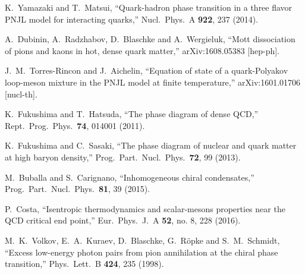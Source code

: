 \documentclass{webofc}
\begin{document}
\begin{thebibliography}{}
  K.~Yamazaki and T.~Matsui,
  ``Quark-hadron phase transition in a three flavor PNJL model for interacting quarks,''
  Nucl.\ Phys.\ A {\bf 922}, 237 (2014).

  A.~Dubinin, A.~Radzhabov, D.~Blaschke and A.~Wergieluk,
  ``Mott dissociation of pions and kaons in hot, dense quark matter,''
  arXiv:1608.05383 [hep-ph].

  J.~M.~Torres-Rincon and J.~Aichelin,
  ``Equation of state of a quark-Polyakov loop-meson mixture in the PNJL model at finite temperature,''
  arXiv:1601.01706 [nucl-th].

  K.~Fukushima and T.~Hatsuda,
  ``The phase diagram of dense QCD,''
  Rept.\ Prog.\ Phys.\  {\bf 74}, 014001 (2011).

  K.~Fukushima and C.~Sasaki,
  ``The phase diagram of nuclear and quark matter at high baryon density,''
  Prog.\ Part.\ Nucl.\ Phys.\  {\bf 72}, 99 (2013).

  M.~Buballa and S.~Carignano,
  ``Inhomogeneous chiral condensates,''
  Prog.\ Part.\ Nucl.\ Phys.\  {\bf 81}, 39 (2015).

  P.~Costa,
  ``Isentropic thermodynamics and scalar-mesons properties near the QCD critical end point,''
  Eur.\ Phys.\ J.\ A {\bf 52}, no. 8, 228 (2016).
 
  M.~K.~Volkov, E.~A.~Kuraev, D.~Blaschke, G.~R\"opke and S.~M.~Schmidt,
  ``Excess low-energy photon pairs from pion annihilation at the chiral phase transition,''
  Phys.\ Lett.\ B {\bf 424}, 235 (1998).


\end{thebibliography}
\end{document}

